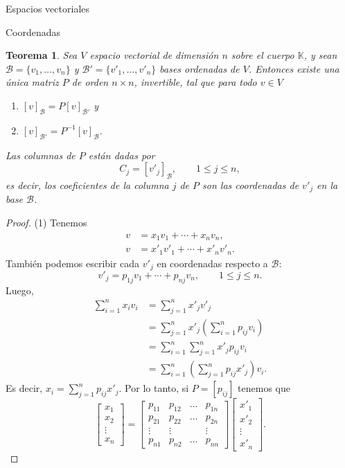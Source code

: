 \documentclass[a4paper,12pt,twoside,spanish,reqno]{amsbook}
\newtheorem{teorema}{Teorema}[section]
\theoremstyle{definition}
\theoremstyle{remark}
\newcommand{\K}{\mathbb K}
\begin{document}
\begin{chapter}{Espacios vectoriales}
\begin{section}{Coordenadas}
    \begin{teorema}
            Sea $V$  espacio vectorial de dimensión $n$  sobre el cuerpo $\K$, 	y sean $	\mathcal{B} = \{v_1,\ldots,v_n\}$ y $\mathcal{B'} = \{v'_1,\ldots,v'_n\}$ bases ordenadas de $V$. Entonces existe una única matriz $P$ de orden $n \times n$, invertible, tal que para todo $v \in V$
            \begin{enumerate}
                \item $[v]_\mathcal{B} = P[v]_\mathcal{B'}$ y
                \item $[v]_\mathcal{B'} = P^{-1}[v]_\mathcal{B}$.
            \end{enumerate} 
            Las columnas de $P$ están dadas por
            $$
            C_j = [v'_j]_\mathcal{B},\qquad 1 \le j \le n,
            $$
            es decir, los coeficientes de la columna $j$ de $P$ son las coordenadas de $v'_j$ en la base $\mathcal{B}$. 
    \end{teorema}
    \begin{proof} (1) Tenemos
        \begin{align*}
            v &=   x_1v_1 + \cdots +x_nv_n, \\
            v &=  x'_1v'_1 + \cdots +x'_nv'_n.
        \end{align*}
         También podemos escribir cada $v'_j$ en coordenadas respecto a $\mathcal B$:
         $$
         v'_j =  p_{1j}v_1 + \cdots +p_{nj}v_n, \qquad  1 \le j \le n.
         $$ 
        Luego, 
        \begin{align*}
             \sum_{i=1}^{n}x_iv_i &=  \sum_{j=1}^{n}x'_jv'_j \\
            &=  \sum_{j=1}^{n}x'_j(\sum_{i=1}^{n}p_{ij}v_i) \\
            &=  \sum_{i=1}^{n}\sum_{j=1}^{n}x'_jp_{ij}v_i \\
            &=  \sum_{i=1}^{n}(\sum_{j=1}^{n}p_{ij}x'_j)v_i.			
        \end{align*}
        Es decir, $x_i = \sum_{j=1}^{n}p_{ij}x'_j$. Por lo tanto, si $P = [p_{ij}]$ tenemos que
        $$
        \begin{bmatrix}x_1 \\ x_2\\ \vdots \\ x_n\end{bmatrix} = 
        \begin{bmatrix}p_{11} &p_{12} & \ldots & p_{1n} \\p_{21} &p_{22} & \ldots & p_{2n} \\ \vdots &\vdots && \vdots\\ p_{n1} &p_{n2} & \ldots & p_{nn}\end{bmatrix}
         \begin{bmatrix}x'_1 \\ x'_2\\ \vdots \\ x'_n\end{bmatrix}.
        $$
        

\end{proof}
\end{section}
\end{chapter}
\end{document}
